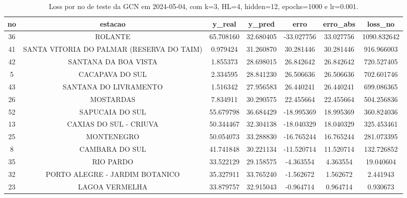 \begin{table}[h]
\centering
\caption{Loss por no de teste da GCN em 2024-05-04, com k=3, HL=4, hidden=12, epochs=1000 e lr=0.001.}
\label{tab:gcn_loss_k3_hl4_h12_e1000_d20240504}
\begin{tabular}{ccccccc}
\toprule
no & estacao & y\_real & y\_pred & erro & erro\_abs & loss\_no \\
\midrule
36 & ROLANTE & 65.708160 & 32.680405 & -33.027756 & 33.027756 & 1090.832642 \\
41 & SANTA VITORIA DO PALMAR (RESERVA DO TAIM) & 0.979424 & 31.260870 & 30.281446 & 30.281446 & 916.966003 \\
42 & SANTANA DA BOA VISTA & 1.855373 & 28.698015 & 26.842642 & 26.842642 & 720.527405 \\
5 & CACAPAVA DO SUL & 2.334595 & 28.841230 & 26.506636 & 26.506636 & 702.601746 \\
43 & SANTANA DO LIVRAMENTO & 1.516342 & 27.956583 & 26.440241 & 26.440241 & 699.086365 \\
26 & MOSTARDAS & 7.834911 & 30.290575 & 22.455664 & 22.455664 & 504.256836 \\
52 & SAPUCAIA DO SUL & 55.679798 & 36.684429 & -18.995369 & 18.995369 & 360.824036 \\
13 & CAXIAS DO SUL - CRIUVA & 50.344467 & 32.304138 & -18.040329 & 18.040329 & 325.453461 \\
25 & MONTENEGRO & 50.054073 & 33.288830 & -16.765244 & 16.765244 & 281.073395 \\
8 & CAMBARA DO SUL & 41.741848 & 30.221134 & -11.520714 & 11.520714 & 132.726852 \\
35 & RIO PARDO & 33.522129 & 29.158575 & -4.363554 & 4.363554 & 19.040604 \\
32 & PORTO ALEGRE - JARDIM BOTANICO & 35.327911 & 33.765240 & -1.562672 & 1.562672 & 2.441943 \\
23 & LAGOA VERMELHA & 33.879757 & 32.915043 & -0.964714 & 0.964714 & 0.930673 \\
\bottomrule
\end{tabular}
\end{table}
